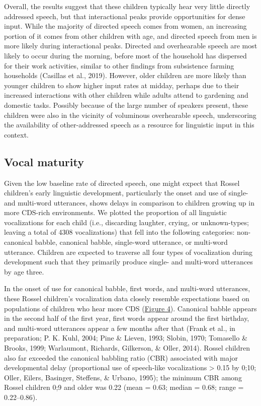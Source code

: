\documentclass[,man,floatsintext]{apa6}
\begin{document}
Overall, the results suggest that these children typically hear very
little directly addressed speech, but that interactional peaks provide
opportunities for dense input. While the majority of directed speech
comes from women, an increasing portion of it comes from other children
with age, and directed speech from men is more likely during
interactional peaks. Directed and overhearable speech are most likely to
occur during the morning, before most of the household has dispersed for
their work activities, similar to other findings from subsistence
farming households (Casillas et al., 2019). However, older children are
more likely than younger children to show higher input rates at midday,
perhaps due to their increased interactions with other children while
adults attend to gardening and domestic tasks. Possibly because of the
large number of speakers present, these children were also in the
vicinity of voluminous overhearable speech, underscoring the
availability of other-addressed speech as a resource for linguistic
input in this context.

\subsection{Vocal maturity}\label{vocal-maturity}

Given the low baseline rate of directed speech, one might expect that
Rossel children's early linguistic development, particularly the onset
and use of single- and multi-word utterances, shows delays in comparison
to children growing up in more CDS-rich environments. We plotted the
proportion of all linguistic vocalizations for each child (i.e.,
discarding laughter, crying, or unknown-types; leaving a total of 4308
vocalizations) that fell into the following categories: non-canonical
babble, canonical babble, single-word utterance, or multi-word
utterance. Children are expected to traverse all four types of
vocalization during development such that they primarily produce single-
and multi-word utterances by age three.

In the onset of use for canonical babble, first words, and multi-word
utterances, these Rossel children's vocalization data closely resemble
expectations based on populations of children who hear more CDS
(\protect\hyperlink{fig4}{Figure 4}). Canonical babble appears in the
second half of the first year, first words appear around the first
birthday, and multi-word utterances appear a few months after that
(Frank et al., in preparation; P. K. Kuhl, 2004; Pine \& Lieven, 1993;
Slobin, 1970; Tomasello \& Brooks, 1999; Warlaumont, Richards,
Gilkerson, \& Oller, 2014). Rossel children also far exceeded the
canonical babbling ratio (CBR) associated with major developmental delay
(proportional use of speech-like vocalizations \textgreater{} 0.15 by
0;10; Oller, Eilers, Basinger, Steffens, \& Urbano, 1995); the minimum
CBR among Rossel children 0;9 and older was 0.22 (mean = 0.63; median =
0.68; range = 0.22--0.86).
\end{document}
